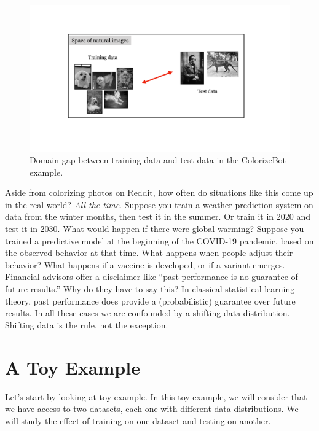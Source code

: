 \begin{figure}[h!]
    \centerline{
    \includegraphics[width=1\linewidth]{./figures/bias_and_shift/colorization_domain_gap.pdf}
    }
    \caption{Domain gap between training data and test data in the ColorizeBot example.}
    \label{fig:bias_and_shift:colorization_domain_gap}
\end{figure}

Aside from colorizing photos on Reddit, how often do situations like this come up in the real world? \textit{All the time}. Suppose you train a weather prediction system on data from the winter months, then test it in the summer. Or train it in 2020 and test it in 2030. What would happen if there were global warming? Suppose you trained a predictive model at the beginning of the COVID-19 pandemic, based on the observed behavior at that time. What happens when people adjust their behavior? What happens if a vaccine is developed, or if a variant emerges. Financial advisors offer a disclaimer like ``past performance is no guarantee of future results.'' Why do they have to say this? In classical statistical learning theory, past performance does provide a (probabilistic) guarantee over future results. In all these cases we are confounded by a shifting data distribution. Shifting data is the rule, not the exception.

\section{A Toy Example}

Let's start by looking at toy example. In this toy example, we will consider that we have access to two datasets, each one with different data distributions. We will study the effect of training on one dataset and testing on another.

